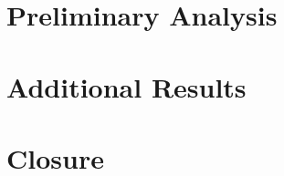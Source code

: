 \documentclass{article}
\begin{document}
    \part{Preliminary Analysis}
    \label{part:prelim}
    



    \epigraphhead[650]{}
    \part{Additional Results}
    \label{part:additional}
    



    \epigraphhead[650]{}
    \part{Closure}
    \label{part:closure}




    \printbibliography[title=References]
    
    
\end{document}
